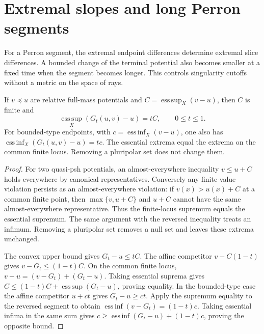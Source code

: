 \section{Extremal slopes and long Perron segments}
\label{sec:perron-extremal-slopes-and-cutoffs}
For a Perron segment, the extremal endpoint differences determine extremal slice differences. A bounded change of the terminal potential also becomes smaller at a fixed time when the segment becomes longer. This controls singularity cutoffs without a metric on the space of rays.

\begin{proposition}\label{prop:geodesic-extremal-difference-slopes}
If $v\preceq u$ are relative full-mass potentials and $C=\operatorname*{ess\,sup}_X(v-u)$, then $C$ is finite and
\[
 \operatorname*{ess\,sup}_X(G_t(u,v)-u)=tC,\qquad0\leq t\leq1.
\]
For bounded-type endpoints, with $c=\operatorname*{ess\,inf}_X(v-u)$, one also has
$\operatorname*{ess\,inf}_X(G_t(u,v)-u)=tc$.
The essential extrema equal the extrema on the common finite locus. Removing a pluripolar set does not change them.
\end{proposition}
\begin{proof}
For two quasi-psh potentials, an almost-everywhere inequality $v\leq u+C$ holds everywhere by canonical representatives. Conversely any finite-value violation persists as an almost-everywhere violation: if $v(x)>u(x)+C$ at a common finite point, then $\max\{v,u+C\}$ and $u+C$ cannot have the same almost-everywhere representative. Thus the finite-locus supremum equals the essential supremum. The same argument with the reversed inequality treats an infimum. Removing a pluripolar set removes a null set and leaves these extrema unchanged.

The convex upper bound gives $G_t-u\leq tC$. The affine competitor $v-C(1-t)$ gives $v-G_t\leq(1-t)C$. On the common finite locus, $v-u=(v-G_t)+(G_t-u)$. Taking essential suprema gives
$C\leq(1-t)C+\operatorname*{ess\,sup}(G_t-u)$, proving equality. In the bounded-type case the affine competitor $u+ct$ gives $G_t-u\geq ct$. Apply the supremum equality to the reversed segment to obtain
$\operatorname*{ess\,inf}(v-G_t)=(1-t)c$.
Taking essential infima in the same sum gives
$c\geq\operatorname*{ess\,inf}(G_t-u)+(1-t)c$, proving the opposite bound.
\end{proof}


